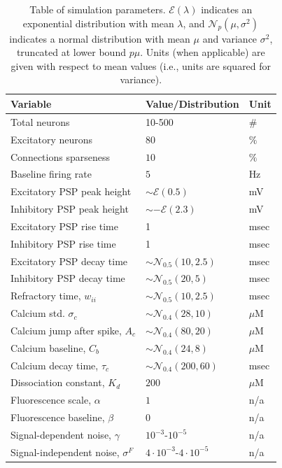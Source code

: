\documentclass[aoas,preprint]{imsart}
\begin{document}
\begin{table}[h!b!p!]
\caption{Table of simulation parameters. $\mathcal{E}(\lambda)$
indicates an exponential distribution with mean $\lambda$, and
$\mathcal{N}_p(\mu,\sigma^2)$ indicates a normal distribution with
mean $\mu$ and variance $\sigma^2$, truncated at lower bound $p\mu$.
Units (when applicable) are given with respect to mean values (i.e.,
units are squared for variance).}\label{table:caparm}

\begin{tabular}{lll}
Variable & Value/Distribution & Unit \\
\hline
Total neurons & 10-500 & \# \\
Excitatory neurons & $80$ & $\%$ \\
Connections sparseness & $10$   & $\%$ \\
Baseline firing rate & $5$ & Hz\\
\hline
Excitatory PSP peak height 	& $\sim \mathcal{E}(0.5)$ & mV \\
Inhibitory PSP peak height 	& $\sim -\mathcal{E}(2.3)$ & mV \\
Excitatory PSP rise time 		& 1 & msec \\
Inhibitory PSP rise time 		& 1 & msec \\
Excitatory PSP decay time 	& $\sim \mathcal{N}_{0.5}(10,2.5)$ & msec \\
Inhibitory PSP decay time 	& $\sim \mathcal{N}_{0.5}(20,5)$ & msec\\
Refractory time, $w_{ii}$ 	& $\sim \mathcal{N}_{0.5}(10,2.5)$ & msec \\
\hline
Calcium std. $\sigma_c$ & $\sim \mathcal{N}_{0.4}(28,10)$ & $\mu$M\\
Calcium jump after spike, $A_c$ &  $\sim \mathcal{N}_{0.4}(80,20)$ & $\mu$M\\
Calcium baseline, $C_b$ & $\sim \mathcal{N}_{0.4}(24,8)$ & $\mu$M\\
Calcium decay time, $\tau_c$ & $\sim \mathcal{N}_{0.4}(200,60)$ & msec\\
Dissociation constant, $K_d$ & $200$ & $\mu$M \\
\hline
Fluorescence scale, $\alpha$ & $1$ & n/a\\
Fluorescence baseline, $\beta$ & $0$ &  n/a\\
Signal-dependent noise, $\gamma$ & $10^{-3}$-$10^{-5}$ & n/a\\
Signal-independent noise, $\sigma^F$ & $4\cdot 10^{-3}$-$4\cdot 10^{-5}$ & n/a\\
\end{tabular}
\end{table}
\end{document}
